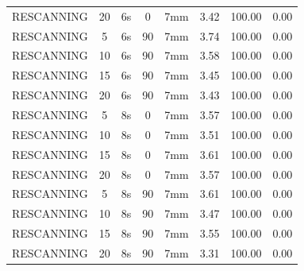 \documentclass[type=dr, dr=rernat, accentcolor=tud7b,colorbacktitle, bigchapter, openright, twoside, 12pt ]{tudthesis}
\begin{document}
\begin{table}[H]
\begin{tabular}{|c|c||c|c|c||c|c|c|}
RESCANNING & 20 & 6s & 0 & 7mm & 3.42 & 100.00 & 0.00 \\
RESCANNING & 5 & 6s & 90 & 7mm & 3.74 & 100.00 & 0.00 \\
RESCANNING & 10 & 6s & 90 & 7mm & 3.58 & 100.00 & 0.00 \\
RESCANNING & 15 & 6s & 90 & 7mm & 3.45 & 100.00 & 0.00 \\
RESCANNING & 20 & 6s & 90 & 7mm & 3.43 & 100.00 & 0.00 \\
RESCANNING & 5 & 8s & 0 & 7mm & 3.57 & 100.00 & 0.00 \\
RESCANNING & 10 & 8s & 0 & 7mm & 3.51 & 100.00 & 0.00 \\
RESCANNING & 15 & 8s & 0 & 7mm & 3.61 & 100.00 & 0.00 \\
RESCANNING & 20 & 8s & 0 & 7mm & 3.57 & 100.00 & 0.00 \\
RESCANNING & 5 & 8s & 90 & 7mm & 3.61 & 100.00 & 0.00 \\
RESCANNING & 10 & 8s & 90 & 7mm & 3.47 & 100.00 & 0.00 \\
RESCANNING & 15 & 8s & 90 & 7mm & 3.55 & 100.00 & 0.00 \\
RESCANNING & 20 & 8s & 90 & 7mm & 3.31 & 100.00 & 0.00 \\
     \hline\hline 
  \end{tabular}
\end{table}   
\end{document}
